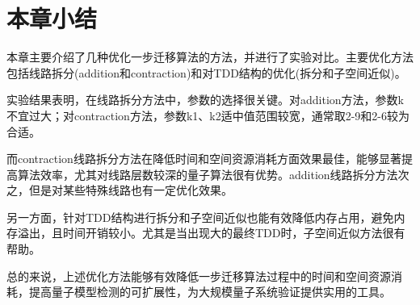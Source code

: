 \section{本章小结}
本章主要介绍了几种优化一步迁移算法的方法，并进行了实验对比。主要优化方法包括线路拆分(addition和contraction)和对TDD结构的优化(拆分和子空间近似)。

实验结果表明，在线路拆分方法中，参数的选择很关键。对addition方法，参数k不宜过大；对contraction方法，参数k1、k2适中值范围较宽，通常取2-9和2-6较为合适。

而contraction线路拆分方法在降低时间和空间资源消耗方面效果最佳，能够显著提高算法效率，尤其对线路层数较深的量子算法很有优势。addition线路拆分方法次之，但是对某些特殊线路也有一定优化效果。

另一方面，针对TDD结构进行拆分和子空间近似也能有效降低内存占用，避免内存溢出，且时间开销较小。尤其是当出现大的最终TDD时，子空间近似方法很有帮助。

总的来说，上述优化方法能够有效降低一步迁移算法过程中的时间和空间资源消耗，提高量子模型检测的可扩展性，为大规模量子系统验证提供实用的工具。